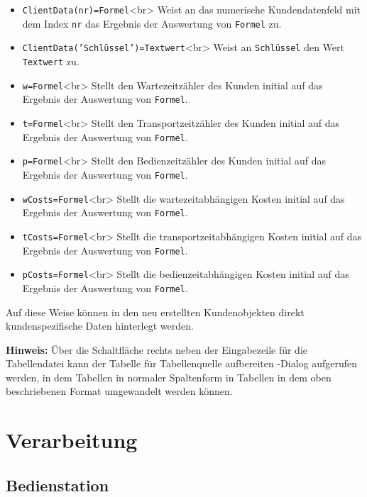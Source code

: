 \begin{itemize}
  \item \texttt{ClientData(nr)=Formel}<br>
  Weist an das numerische Kundendatenfeld mit dem Index \texttt{nr} das Ergebnis der
  Auswertung von \texttt{Formel} zu. 
  \item \texttt{ClientData('Schlüssel')=Textwert}<br>
  Weist an \texttt{Schlüssel} den Wert \texttt{Textwert} zu. 
  \item \texttt{w=Formel}<br>
  Stellt den Wartezeitzähler des Kunden initial auf das Ergebnis der
  Auswertung von \texttt{Formel}.   
  \item \texttt{t=Formel}<br>
  Stellt den Transportzeitzähler des Kunden initial auf das Ergebnis der
  Auswertung von \texttt{Formel}. 
  \item \texttt{p=Formel}<br>
  Stellt den Bedienzeitzähler des Kunden initial auf das Ergebnis der
  Auswertung von \texttt{Formel}. 
  \item \texttt{wCosts=Formel}<br>
  Stellt die wartezeitabhängigen Kosten initial auf das Ergebnis der
  Auswertung von \texttt{Formel}. 
  \item \texttt{tCosts=Formel}<br>
  Stellt die transportzeitabhängigen Kosten initial auf das Ergebnis der
  Auswertung von \texttt{Formel}. 
  \item \texttt{pCosts=Formel}<br>
  Stellt die bedienzeitabhängigen Kosten initial auf das Ergebnis der
  Auswertung von \texttt{Formel}. 
\end{itemize}

Auf diese Weise können in den neu erstellten Kundenobjekten direkt kundenspezifische Daten
hinterlegt werden. 

\textbf{Hinweis:}
Über die Schaltfläche rechts neben der Eingabezeile für die Tabellendatei kann der
Tabelle für Tabellenquelle aufbereiten -Dialog
aufgerufen werden, in dem Tabellen in normaler Spaltenform in Tabellen in dem oben
beschriebenen Format umgewandelt werden können.





\chapter{Verarbeitung}

\section{Bedienstation}
\label{ref:ModelElementProcess}

